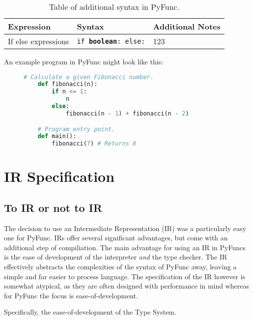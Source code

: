 \documentclass{l4proj}
\begin{document}
\begin{table}[!h]
    \caption{Table of additional syntax in PyFunc.}
    \begin{center}
    \begin{tabular}{@{}|l|l|l|@{}}
        \hline
        \textbf{Expression}  &   \textbf{Syntax}     &   \textbf{Additional Notes}   \\
        \hline
        If else expressions  &   \texttt{if \textbf{boolean}: else:} & 123           \\
        \hline
    \end{tabular}
    \end{center}
\end{table}

An example program in PyFunc might look like this:
\begin{figure}[!h]
\begin{lstlisting}[language=python, caption={The simple recursive function to calculate a given fibonacci number.}, label=lst:callahan]
    # Calculate a given Fibonacci number.
    def fibonacci(n):
        if n <= 1:
            n
        else:
            fibonacci(n - 1) + fibonacci(n - 2)

    # Program entry point.
    def main():
        fibonacci(7) # Returns 8
\end{lstlisting}
\end{figure}

\section{IR Specification}
\subsection{To IR or not to IR}
The decision to use an Intermediate Representation (IR) was a particularly easy one for PyFunc.
IRs offer several significant advantages, but come with an additional step of compiliation.
The main advantage for using an IR in PyFuncs is the ease of development of the interpreter \emph{and} the type checker.
The IR effectively abstracts the complexities of the syntax of PyFunc away, leaving a simple and far easier to process language.
The specification of the IR however is somewhat atypical, as they are often designed with performance in mind whereas for PyFunc the focus is ease-of-development.

Specifically, the ease-of-development of the Type System.
\end{document}
